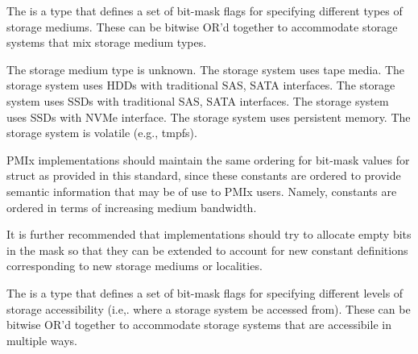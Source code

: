 
The  is a  type that defines a set of bit-mask flags for specifying different types of storage mediums. These can be bitwise OR'd together to accommodate storage systems that mix storage medium types.

\begin{constantdesc}
%
The storage medium type is unknown.
%
The storage system uses tape media.
%
The storage system uses HDDs with traditional SAS, SATA interfaces.
%
The storage system uses SSDs with traditional SAS, SATA interfaces.
%
The storage system uses SSDs with NVMe interface.
%
The storage system uses persistent memory.
%
The storage system is volatile (e.g., tmpfs).
%
\end{constantdesc}

\adviceimplstart
PMIx implementations should maintain the same ordering for bit-mask values for  struct as provided in this standard, since these constants are ordered to provide semantic information that may be of use to PMIx users. Namely,  constants are ordered in terms of increasing medium bandwidth.

It is further recommended that implementations should try to allocate empty bits in the mask so that they can be extended to account for new constant definitions corresponding to new storage mediums or localities.
\adviceimplend


The  is a  type that defines a set of bit-mask flags for specifying different levels of storage accessibility (i.e,. where a storage system be accessed from). These can be bitwise OR'd together to accommodate storage systems that are accessibile in multiple ways.

